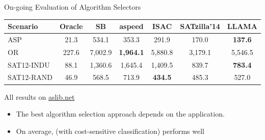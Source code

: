 \begin{frame}[c]{On-going Evaluation of Algorithm Selectors}

\small
\begin{table}
\begin{tabular}{l | cc | c c c c}
\toprule
Scenario & Oracle & SB & aspeed & ISAC & SATzilla'14 & LLAMA\\
\midrule
ASP & 21.3 & 534.1 & 353.3 & 291.9 & 170.0 & \textbf{137.6}\\
OR & 227.6 & 7,002.9 & \textbf{1,964.1} & 5,880.8 & 3,179.1 & 5,546.5\\
SAT12-INDU & 88.1 & 1,360.6 & 1,645.4 & 1,409.5 & 839.7 & \textbf{783.4}\\
SAT12-RAND & 46.9 & 568.5 & 713.9 & \textbf{434.5} & 485.3 & 527.0\\
\bottomrule
\end{tabular}
\end{table}

\centering
\small
All results on \url{aslib.net}

\bigskip
\pause
\begin{itemize}
  \item The best algorithm selection approach depends on the application.
  \item On average, \satzilla{} (with cost-sensitive classification) performs well 
\end{itemize}


\end{frame}
